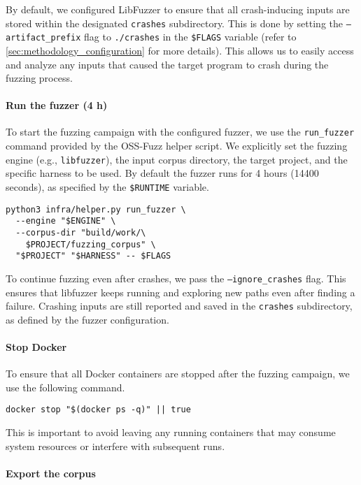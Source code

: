 By default, we configured LibFuzzer to ensure that all crash-inducing inputs are stored within the designated \texttt{crashes} subdirectory. This is done by setting the \texttt{---artifact\_prefix} flag to \texttt{./crashes} in the \texttt{\$FLAGS} variable (refer to \autoref{sec:methodology_configuration} for more details). This allows us to easily access and analyze any inputs that caused the target program to crash during the fuzzing process.

\noindent \paragraph{Run the fuzzer (4 h)}

To start the fuzzing campaign with the configured fuzzer, we use the \texttt{run\_fuzzer} command provided by the OSS-Fuzz helper script. We explicitly set the fuzzing engine (e.g., \texttt{libfuzzer}), the input corpus directory, the target project, and the specific harness to be used. By default the fuzzer runs for 4 hours (14400 seconds), as specified by the \texttt{\$RUNTIME} variable.

\begin{verbatim}
python3 infra/helper.py run_fuzzer \
  --engine "$ENGINE" \
  --corpus-dir "build/work/\
    $PROJECT/fuzzing_corpus" \
  "$PROJECT" "$HARNESS" -- $FLAGS
    \end{verbatim}

To continue fuzzing even after crashes, we pass the \texttt{--ignore\_crashes} flag. This ensures that libfuzzer keeps running and exploring new paths even after finding a failure. Crashing inputs are still reported and saved in the \texttt{crashes} subdirectory, as defined by the fuzzer configuration.

\noindent \paragraph{Stop Docker}

To ensure that all Docker containers are stopped after the fuzzing campaign, we use the following command.

\begin{verbatim}
docker stop "$(docker ps -q)" || true
    \end{verbatim}

This is important to avoid leaving any running containers that may consume system resources or interfere with subsequent runs.

\noindent \paragraph{Export the corpus}

